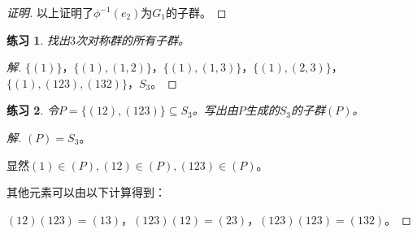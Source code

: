 \documentclass{article}
\newtheorem{Exercise}{练习}
\begin{document}
\begin{CJK*}{UTF8}{gbsn}
\begin{proof}[证明]
以上证明了$\phi^{-1}(e_2)$为$G_1$的子群。
\end{proof}
\begin{Exercise}
  找出$3$次对称群的所有子群。
\end{Exercise}
\begin{proof}[解]
  $\{(1)\}$，$\{(1),(1,2)\}$，$\{(1),(1,3)\}$，$\{(1),(2,3)\}$，$\{(1),(123),(132)\}$，$S_3$。
\end{proof}

\begin{Exercise}
  令$P=\{(12),(123)\}\subseteq S_3$。写出由$P$生成的$S_3$的子群$(P)$。
\end{Exercise}
\begin{proof}[解]
  $(P)=S_3$。

  显然$(1)\in (P),(12)\in (P),(123)\in (P)$。

  其他元素可以由以下计算得到：

  $(12)(123)=(13)$，$(123)(12)=(23)$，$(123)(123)=(132)$。
\end{proof}
\end{CJK*}
\end{document}
